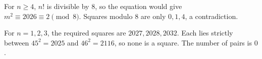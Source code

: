 For $n\ge4$, $n!$ is divisible by $8$, so the equation would give $m^2\equiv2026\equiv2\pmod8$. Squares modulo $8$ are only $0,1,4$, a contradiction.

For $n=1,2,3$, the required squares are $2027,2028,2032$. Each lies strictly between $45^2=2025$ and $46^2=2116$, so none is a square. The number of pairs is $\boxed0$.
